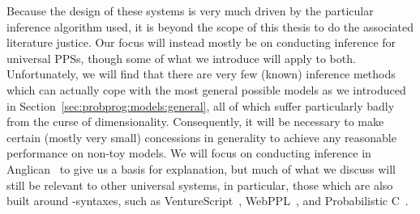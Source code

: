 Because the design of these systems is very much driven by the particular inference algorithm used, it is
beyond the scope of this thesis to do the associated literature justice.  Our focus will instead mostly be on 
conducting inference for universal PPSs, though some of what we introduce will apply to both.
Unfortunately, we will find that there are very few (known) inference
methods which can actually cope with the most general possible models as we introduced in
Section~\ref{sec:probprog:models:general}, all of which suffer particularly badly from the curse of
dimensionality.  Consequently, it will be necessary to make certain (mostly very small) concessions in 
generality to achieve any reasonable performance on non-toy models.  We will focus on conducting
inference in Anglican~\citep{wood2014new,tolpin2016design} to give us a basis for explanation, but much of
what we discuss will still be relevant to other universal systems, in particular, those which
are also built around \sample-\observe syntaxes, such as VentureScript~\citep{mansinghka2014venture}, 
WebPPL~\citep{goodman_book_2014}, and Probabilistic C~\citep{paige2014compilation}.




